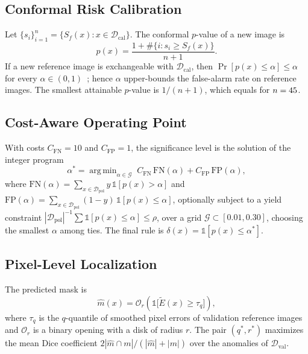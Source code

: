 \documentclass[conference]{IEEEtran}
\newcommand{\Etil}{\tilde{E}}
\DeclareMathOperator*{\argmin}{arg\,min}
\begin{document}
\subsection{Conformal Risk Calibration}
Let $\{s_i\}_{i=1}^{n}=\{S_f(x):x\in\mathcal{D}_{\mathrm{cal}}\}$. The conformal $p$-value of a new image is
\begin{equation}
p(x)=\frac{1+\#\{i: s_i\ge S_f(x)\}}{n+1}.
\end{equation}
If a new reference image is exchangeable with $\mathcal{D}_{\mathrm{cal}}$, then $\Pr[p(x)\le\alpha]\le\alpha$ for every $\alpha\in(0,1)$~\cite{vovk2005,bates2023}; hence $\alpha$ upper-bounds the false-alarm rate on reference images. The smallest attainable $p$-value is $1/(n+1)$, which equals \MinP{} for $n=45{}$.

\subsection{Cost-Aware Operating Point}
With costs $C_{\mathrm{FN}}=10$ and $C_{\mathrm{FP}}=1$, the significance level is the solution of the integer program
\begin{equation}
\alpha^*=\argmin_{\alpha\in\mathcal{G}}\; C_{\mathrm{FN}}\,\mathrm{FN}(\alpha)+C_{\mathrm{FP}}\,\mathrm{FP}(\alpha),
\end{equation}
where $\mathrm{FN}(\alpha)=\sum_{x\in\mathcal{D}_{\mathrm{pol}}} y\,\mathbb{1}[p(x)>\alpha]$ and $\mathrm{FP}(\alpha)=\sum_{x\in\mathcal{D}_{\mathrm{pol}}}(1-y)\,\mathbb{1}[p(x)\le\alpha]$, optionally subject to a yield constraint $|\mathcal{D}_{\mathrm{pol}}|^{-1}\sum\mathbb{1}[p(x)\le\alpha]\le\rho$, over a grid $\mathcal{G}\subset[0.01,0.30]$, choosing the smallest $\alpha$ among ties. The final rule is $\delta(x)=\mathbb{1}[p(x)\le\alpha^*]$.

\subsection{Pixel-Level Localization}
The predicted mask is
\begin{equation}
\hat m(x)=\mathcal{O}_r\!\left(\mathbb{1}\big[\Etil(x)\ge\tau_q\big]\right),
\end{equation}
where $\tau_q$ is the $q$-quantile of smoothed pixel errors of validation reference images and $\mathcal{O}_r$ is a binary opening with a disk of radius $r$. The pair $(q^*,r^*)$ maximizes the mean Dice coefficient $2|\hat m\cap m|/(|\hat m|+|m|)$ over the anomalies of $\mathcal{D}_{\mathrm{val}}$.
\end{document}
